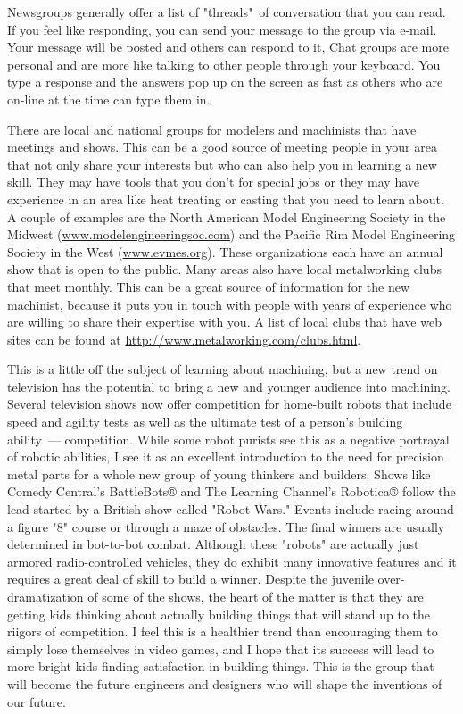 Newsgroups generally offer a list of "threads"\ of conversation that you can
read. If you feel like responding, you can send your message to the group via
e-mail. Your message will be posted and others can respond to it, Chat groups
are more personal and are more like talking to other people through your
keyboard. You type a response and the answers pop up on the screen as fast as
others who are on-line at the time can type them in.


There are local and national groups for modelers and machinists that have
meetings and shows. This can be a good source of meeting people in your area
that not only share your interests but who can also help you in learning a new
skill. They may have tools that you don't for special jobs or they may have
experience in an area like heat treating or casting that you need to learn
about. A couple of examples are the North American Model Engineering Society in
the Midwest (\url{www.modelengineeringsoc.com}) and the Pacific Rim Model
Engineering Society in the West (\url{www.evmes.org}). These organizations each
have an annual show that is open to the public. Many areas also have local
metalworking clubs that meet monthly. This can be a great source of information
for the new machinist, because it puts you in touch with people with years of
experience who are willing to share their expertise with you. A list of local
clubs that have web sites can be found at
\url{http://www.metalworking.com/clubs.html}.


This is a little off the subject of learning about machining, but a new trend on
television has the potential to bring a new and younger audience into machining.
Several television shows now offer competition for home-built robots that
include speed and agility tests as well as the ultimate test of a person's
building ability\ --- competition. While some robot purists see this as a
negative portrayal of robotic abilities, I see it as an excellent introduction
to the need for precision metal parts for a whole new group of young thinkers
and builders. Shows like Comedy Central's BattleBots® and The Learning Channel's
Robotica® follow the lead started by a British show called "Robot Wars." Events
include racing around a figure "8" course or through a maze of obstacles. The
final winners are usually determined in bot-to-bot combat. Although these
"robots" are actually just armored radio-controlled vehicles, they do exhibit
many innovative features and it requires a great deal of skill to build a
winner. Despite the juvenile over-dramatization of some of the shows, the heart
of the matter is that they are getting kids thinking about actually building
things that will stand up to the riigors of competition. I feel this is a
healthier trend than encouraging them to simply lose themselves in video games,
and I hope that its success will lead to more bright kids finding satisfaction
in building things. This is the group that will become the future engineers and
designers who will shape the inventions of our future.

